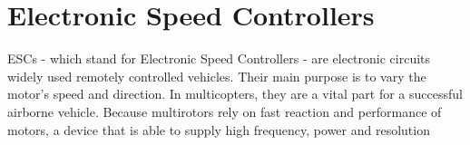 \section{Electronic Speed Controllers}
ESCs - which stand for Electronic Speed Controllers - are electronic circuits widely used remotely controlled vehicles. Their main purpose is to vary the motor's speed and direction. %
\newline
In multicopters, they are a vital part for a successful airborne vehicle. Because multirotors rely on fast reaction and performance of motors, a device that is able to supply high frequency, power and resolution 